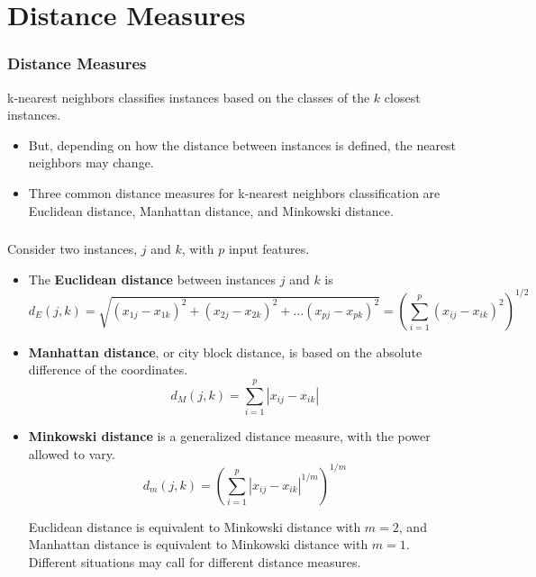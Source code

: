 \documentclass[8pt,dvipsnames]{beamer}
\begin{document}
\section{Distance Measures}
\begin{frame}
	\frametitle{Distance Measures}
	k-nearest neighbors classifies instances based on the classes of the \(k\) closest instances.
	\begin{itemize}
		\item But, depending on how the distance between instances is defined, the nearest neighbors may change.
		\item  Three common distance measures for k-nearest neighbors
		      classification are Euclidean distance, Manhattan distance, and Minkowski distance.
	\end{itemize}

\end{frame}
\begin{frame}
	\frametitle{}
	Consider two instances, \(j\) and \(k\), with \(p\) input features.
	\begin{itemize}
		\item  The \textbf{Euclidean distance} between instances \(j\) and \(k\) is
		      $$
			      d_{E}(j, k)=\sqrt{\left(x_{1 j}-x_{1 k}\right)^{2}+\left(x_{2 j}-x_{2 k}\right)^{2}+\ldots\left(x_{p j}-x_{p k}\right)^{2}}=\left(\sum_{i=1}^{p}\left(x_{i j}-x_{i k}\right)^{2}\right)^{1 / 2}
		      $$
		\item \textbf{Manhattan distance}, or city block distance, is based on the absolute difference of the coordinates.
		      $$
			      d_{M}(j, k)=\sum_{i=1}^{p}\left|x_{i j}-x_{i k}\right|
		      $$
		\item \textbf{Minkowski distance}  is a generalized distance measure, with the power allowed to vary.
		      $$
			      d_{m}(j, k)=\left(\sum_{i=1}^{p}\left|x_{i j}-x_{i k}\right|^{1 / m}\right)^{1 / m}
		      $$

		      Euclidean distance is equivalent to Minkowski distance with \(m=2\), and Manhattan distance is equivalent to Minkowski
		      distance with \(m=1\). Different situations may call for different distance measures.
	\end{itemize}
\end{frame}
\end{document}
